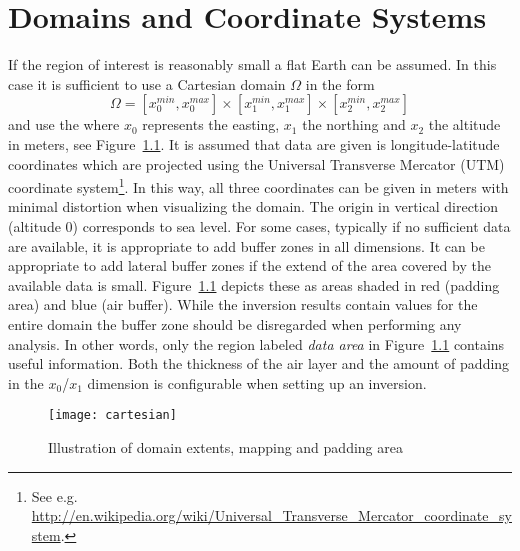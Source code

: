 \chapter{Domains and Coordinate Systems}\label{Chp:ref:coordinates}

If the region of interest is reasonably small a flat Earth can be assumed. In this case
it is sufficient to use a  Cartesian domain $\Omega$ in the form
\begin{equation} \label{REF:EQU:INTRO 8}
\Omega = [x^{min}_0, x^{max}_0] \times
 [x^{min}_1, x^{max}_1] \times
 [x^{min}_2, x^{max}_2] 
\end{equation} 
and use the 
where $x_0$ represents the easting, $x_1$ the northing and $x_2$ the altitude in meters, see Figure~\ref{fig:cartesianDomain}.
It is assumed that data are given is longitude-latitude coordinates which are projected using the   
Universal Transverse Mercator (UTM) coordinate system\footnote{See
    e.g. \url{http://en.wikipedia.org/wiki/Universal_Transverse_Mercator_coordinate_system}.}. 
In this way, all three coordinates can be given in meters with minimal
distortion when visualizing the domain.
The origin in vertical direction (altitude 0) corresponds to sea level.
For some cases, typically if no sufficient data are available, it is appropriate 
to add buffer zones in all dimensions. It can be appropriate to add lateral buffer zones if the 
extend of the area covered by the available data is small. 
Figure~\ref{fig:cartesianDomain} depicts these as areas shaded in red (padding
area) and blue (air buffer).
While the inversion results contain values for the entire domain the buffer zone
should be disregarded when performing any analysis.
In other words, only the region labeled \emph{data area} in
Figure~\ref{fig:cartesianDomain} contains useful information.
Both the thickness of the air layer and the amount of padding in the $x_0$/$x_1$
dimension is configurable when setting up an inversion.

\begin{figure}[ht]
    \centering\texttt{[image: cartesian]}
    \caption{Illustration of domain extents, mapping and padding area}
    \label{fig:cartesianDomain}
\end{figure}

